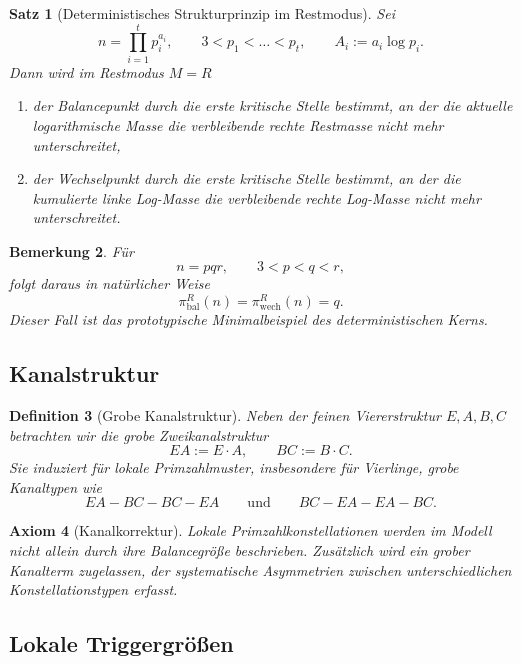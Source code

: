 \documentclass[11pt,a4paper]{article}
\newtheorem{definition}{Definition}[section]
\newtheorem{axiom}[definition]{Axiom}
\newtheorem{satz}[definition]{Satz}
\newtheorem{bemerkung}[definition]{Bemerkung}
\begin{document}
	\begin{satz}[Deterministisches Strukturprinzip im Restmodus]
		\label{satz:modell_restmodus}
		Sei
		\[
		n=\prod_{i=1}^t p_i^{a_i},
		\qquad
		3<p_1<\dots<p_t,
		\qquad
		A_i:=a_i\log p_i.
		\]
		Dann wird im Restmodus \(M=R\)
		
		\begin{enumerate}
			\item der Balancepunkt durch die erste kritische Stelle bestimmt, an der die aktuelle logarithmische Masse die verbleibende rechte Restmasse nicht mehr unterschreitet,
			\item der Wechselpunkt durch die erste kritische Stelle bestimmt, an der die kumulierte linke Log-Masse die verbleibende rechte Log-Masse nicht mehr unterschreitet.
		\end{enumerate}
	\end{satz}
	
	\begin{bemerkung}
		Für
		\[
		n=pqr,\qquad 3<p<q<r,
		\]
		folgt daraus in natürlicher Weise
		\[
		\pi_{\text{bal}}^R(n)=\pi_{\text{wech}}^R(n)=q.
		\]
		Dieser Fall ist das prototypische Minimalbeispiel des deterministischen Kerns.
	\end{bemerkung}
	
	\subsection{Kanalstruktur}
	
	\begin{definition}[Grobe Kanalstruktur]
		\label{def:modell_kanal}
		Neben der feinen Viererstruktur \(E,A,B,C\) betrachten wir die grobe Zweikanalstruktur
		\[
		EA:=E\cdot A,\qquad BC:=B\cdot C.
		\]
		Sie induziert für lokale Primzahlmuster, insbesondere für Vierlinge, grobe Kanaltypen wie
		\[
		EA-BC-BC-EA
		\qquad\text{und}\qquad
		BC-EA-EA-BC.
		\]
	\end{definition}
	
	\begin{axiom}[Kanalkorrektur]
		\label{ax:kanalkorrektur}
		Lokale Primzahlkonstellationen werden im Modell nicht allein durch ihre Balancegröße beschrieben. Zusätzlich wird ein grober Kanalterm zugelassen, der systematische Asymmetrien zwischen unterschiedlichen Konstellationstypen erfasst.
	\end{axiom}
	
	\subsection{Lokale Triggergrößen}
	
\end{document}
